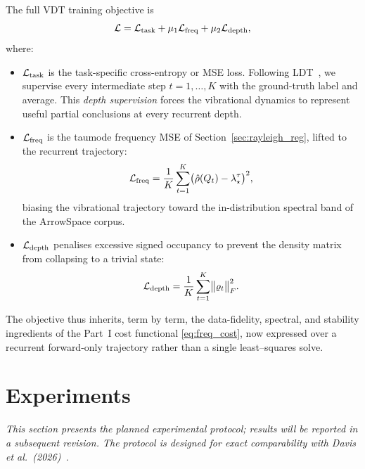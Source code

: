 \documentclass[12pt,a4paper]{article}
\theoremstyle{plain}
\theoremstyle{definition}
\theoremstyle{remark}
\newcommand{\1}{\mathbf{1}}
\newcommand{\VDT}{\textsc{VDT}}
\begin{document}
The full \VDT{} training objective is
\begin{equation}
  \mathcal{L} = \mathcal{L}_{\rm task}
              + \mu_1 \mathcal{L}_{\rm freq}
              + \mu_2 \mathcal{L}_{\rm depth},
  \label{eq:total_loss}
\end{equation}
where:
\begin{itemize}
  \item $\mathcal{L}_{\rm task}$ is the task-specific cross-entropy or
        MSE loss. Following \textsc{LDT}~\cite{davis2026ldt}, we supervise
        every intermediate step $t = 1,\dots,K$ with the ground-truth
        label and average. This \emph{depth supervision} forces the
        vibrational dynamics to represent useful partial conclusions at
        every recurrent depth.
  \item $\mathcal{L}_{\rm freq}$ is the taumode frequency MSE of
        Section~\ref{sec:rayleigh_reg}, lifted to the recurrent
        trajectory:
        \begin{equation}
          \mathcal{L}_{\rm freq}
          = \frac{1}{K} \sum_{t=1}^K
            \bigl(\hat\rho(Q_t) - \lambda_\star^\tau \bigr)^2,
          \label{eq:freq_loss}
        \end{equation}
        biasing the vibrational trajectory toward the in-distribution
        spectral band of the ArrowSpace corpus.
  \item $\mathcal{L}_{\rm depth}$ penalises excessive signed occupancy to
        prevent the density matrix from collapsing to a trivial state:
        \begin{equation}
          \mathcal{L}_{\rm depth}
          = \frac{1}{K} \sum_{t=1}^K \bigl\| \varrho_t \bigr\|_F^2 .
          \label{eq:depth_loss}
        \end{equation}
\end{itemize}
The objective thus inherits, term by term, the data-fidelity, spectral,
and stability ingredients of the Part~I cost functional
\eqref{eq:freq_cost}, now expressed over a recurrent forward-only
trajectory rather than a single least--squares solve.

\section{Experiments}
\label{sec:experiments}

\emph{This section presents the planned experimental protocol; results
will be reported in a subsequent revision. The protocol is designed for
exact comparability with Davis et al.~(2026)~\cite{davis2026ldt}.}
\end{document}
